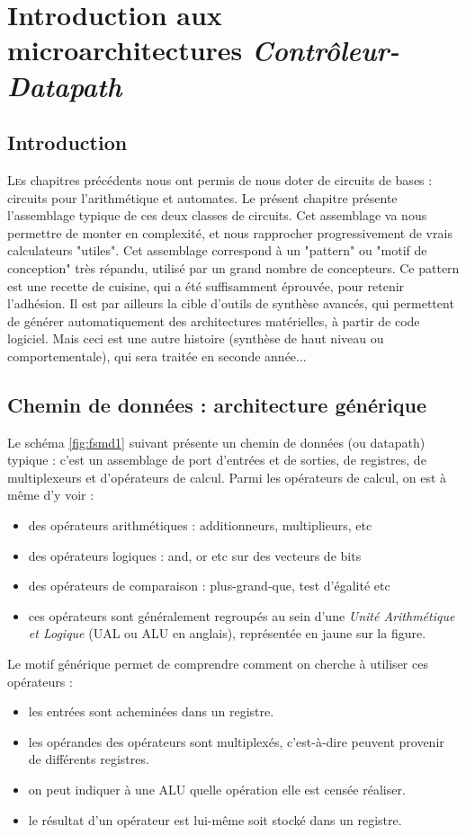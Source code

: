 \chapter[Introduction aux microarchitectures]{Introduction aux microarchitectures \it{Contrôleur-Datapath}}
\minitoc

\section{Introduction}
\lettrine{L} es chapitres précédents nous ont permis de nous doter de circuits de bases : circuits pour l'arithmétique et automates.
Le présent chapitre présente l'assemblage typique de ces deux classes de circuits. Cet assemblage va nous permettre de monter en complexité,
et nous rapprocher progressivement de vrais calculateurs "utiles". Cet assemblage correspond à un "pattern" ou "motif de conception" très répandu, utilisé par
un grand nombre de concepteurs. Ce pattern est une recette de cuisine, qui a été suffisamment éprouvée, pour retenir l'adhésion. Il est par ailleurs
la cible d'outils de synthèse avancés, qui permettent de générer automatiquement des architectures matérielles, à partir de code logiciel.
Mais ceci est une autre histoire (synthèse de haut niveau ou comportementale), qui sera traitée en seconde année...

\section{Chemin de données : architecture générique}
Le schéma \ref{fig:fsmd1} suivant présente un chemin de données (ou datapath) typique : c'est un assemblage de port d'entrées et de sorties, de registres, de multiplexeurs et d'opérateurs de calcul.
Parmi les opérateurs de calcul, on est à même d'y voir :
\begin{itemize}
  \item des opérateurs arithmétiques : additionneurs, multiplieurs, etc
  \item des opérateurs logiques : and, or etc sur des vecteurs de bits
  \item des opérateurs de comparaison : plus-grand-que, test d'égalité etc
  \item ces opérateurs sont généralement regroupés au sein d'une {\it Unité Arithmétique et Logique} (UAL ou ALU en anglais), représentée en jaune sur la figure.
\end{itemize}

Le motif générique permet de comprendre comment on cherche à utiliser ces opérateurs :
\begin{itemize}
  \item les entrées sont acheminées dans un registre.
  \item les opérandes des opérateurs sont multiplexés, c'est-à-dire peuvent provenir de différents registres.
  \item on peut indiquer à une ALU quelle opération elle est censée réaliser.
  \item le résultat d'un opérateur est lui-même soit stocké dans un registre.
\end{itemize}

